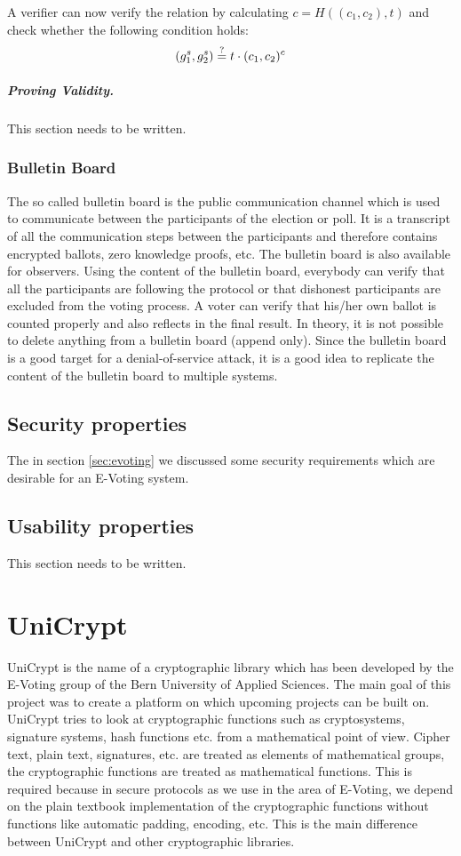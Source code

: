 \documentclass[numbers=noenddot, abstract=on, a4paper, headsepline,
footsepline, oneside, draft=off]{scrreprt}
\begin{document}
A verifier can now verify the relation by calculating
$c=H((c_1,c_2),t)$ and check whether the following condition holds:
\begin{equation}
	(g_1^s, g_2^s) \stackrel{?}{=} t \cdot (c_1, c_2)^c \notag
\end{equation}


\subparagraph{Proving Validity.}
This section needs to be written. 


\subsubsection{Bulletin Board}
\label{sec:bulletinboard}
The so called bulletin board is the public communication channel which is used
to communicate between the participants of the election or poll. It is a
transcript of all the communication steps between the participants and therefore
contains encrypted ballots, zero knowledge proofs, etc. The bulletin board is
also available for observers. Using the content of the bulletin board, everybody
can verify that all the participants are following the protocol or that
dishonest participants are excluded from the voting process. A voter can verify
that his/her own ballot is counted properly and also reflects in the final
result. In theory, it is not possible to delete anything from a bulletin board
(append only). Since the bulletin board is a good target for a denial-of-service
attack, it is a good idea to replicate the content of the bulletin board to
multiple systems.


\subsection{Security properties}
\label{sec:secproperties}
The in section \vref{sec:evoting} we discussed some security requirements which
are desirable for an E-Voting system.

\subsection{Usability properties}
\label{sec:usabilityproperties}
This section needs to be written. 

\section{UniCrypt}
\label{sec:unicrypt}
UniCrypt is the name of a cryptographic library which has been developed by the
E-Voting group of the Bern University of Applied Sciences. The main goal of this
project was to create a platform on which upcoming projects can be built on.
UniCrypt tries to look at cryptographic functions such as cryptosystems,
signature systems, hash functions etc. from a mathematical point of view. Cipher
text, plain text, signatures, etc. are treated as elements of mathematical
groups, the cryptographic functions are treated as mathematical functions. This
is required because in secure protocols as we use in the area of E-Voting, we
depend on the plain textbook implementation of the cryptographic functions
without functions like automatic padding, encoding, etc. This is the main
difference between UniCrypt and other cryptographic libraries.
\end{document}
